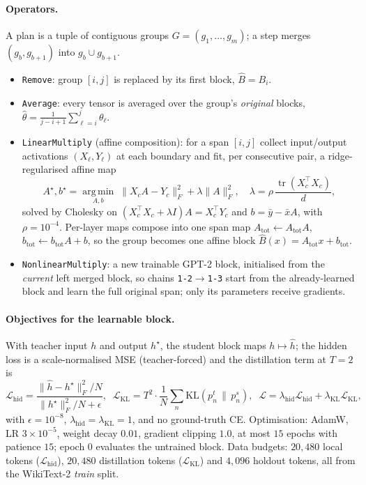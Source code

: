 \documentclass[10pt,a4paper]{article}
\newcommand{\removeop}{\texttt{Remove}}
\newcommand{\averageop}{\texttt{Average}}
\newcommand{\linop}{\texttt{LinearMultiply}}
\newcommand{\nlop}{\texttt{NonlinearMultiply}}
\begin{document}
\paragraph{Operators.} A plan is a tuple of contiguous groups
$G=(g_1,\dots,g_m)$; a step merges $(g_b,g_{b+1})$ into $g_b\cup g_{b+1}$.
\begin{itemize}
  \item \removeop{}: group $[i,j]$ is replaced by its first block, $\hat B=B_i$.
  \item \averageop{}: every tensor is averaged over the group's \emph{original}
    blocks, $\hat\theta = \frac{1}{j-i+1}\sum_{\ell=i}^{j}\theta_\ell$.
  \item \linop{} (affine composition): for a span $[i,j]$ collect input/output
    activations $(X_\ell,Y_\ell)$ at each boundary and fit, per consecutive pair,
    a ridge-regularised affine map
    \begin{equation}
    A^\star,b^\star = \operatorname*{arg\,min}_{A,b}\;
    \lVert X_cA-Y_c\rVert_F^2 + \lambda\lVert A\rVert_F^2,\quad
    \lambda = \rho\,\frac{\operatorname{tr}(X_c^\top X_c)}{d},
    \end{equation}
    solved by Cholesky on $(X_c^\top X_c+\lambda I)A = X_c^\top Y_c$ and
    $b=\bar y-\bar xA$, with $\rho=10^{-4}$. Per-layer maps compose into one span
    map $A_{\text{tot}} \leftarrow A_{\text{tot}}A$,
    $b_{\text{tot}} \leftarrow b_{\text{tot}}A + b$, so the group becomes one
    affine block $\hat B(x)=A_{\text{tot}}x+b_{\text{tot}}$.
  \item \nlop{}: a new trainable GPT-2 block, initialised from the \emph{current}
    left merged block, so chains \texttt{1-2}$\to$\texttt{1-3} start from the
    already-learned block and learn the full original span; only its parameters
    receive gradients.
\end{itemize}

\paragraph{Objectives for the learnable block.} With teacher input $h$ and output
$h^\star$, the student block maps $h\mapsto\hat h$; the hidden loss is a
scale-normalised MSE (teacher-forced) and the distillation term at $T=2$ is
\begin{equation}
\mathcal{L}_{\text{hid}} = \frac{\lVert \hat h - h^\star\rVert_F^2 / N}
{\lVert h^\star\rVert_F^2 / N + \epsilon},\;\;
\mathcal{L}_{\text{KL}} = T^2 \cdot \frac{1}{N}\sum_{n}
\mathrm{KL}\!\left(p^t_n \,\lVert\, p^s_n\right),\;\;
\mathcal{L} = \lambda_{\text{hid}}\mathcal{L}_{\text{hid}}
+ \lambda_{\text{KL}}\mathcal{L}_{\text{KL}},
\end{equation}
with $\epsilon=10^{-8}$, $\lambda_{\text{hid}}=\lambda_{\text{KL}}=1$, and no
ground-truth CE. Optimisation: AdamW, LR $3\times10^{-5}$, weight decay $0.01$,
gradient clipping $1.0$, at most $15$ epochs with patience $15$; epoch $0$
evaluates the untrained block. Data budgets: $20{,}480$ local tokens
($\mathcal{L}_{\text{hid}}$), $20{,}480$ distillation tokens
($\mathcal{L}_{\text{KL}}$) and $4{,}096$ holdout tokens, all from the WikiText-2
\emph{train} split.
\end{document}
